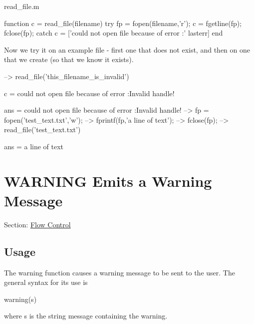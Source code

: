 \begin{DoxyVerb}     read_file.m
\end{DoxyVerb}



\begin{DoxyVerbInclude}
function c = read_file(filename)
try
   fp = fopen(filename,'r');
   c = fgetline(fp);
   fclose(fp);
catch
   c = ['could not open file because of error :' lasterr]
end
\end{DoxyVerbInclude}


Now we try it on an example file -\/ first one that does not exist, and then on one that we create (so that we know it exists).


\begin{DoxyVerbInclude}
--> read_file('this_filename_is_invalid')

c = 
could not open file because of error :Invalid handle!

ans = 
could not open file because of error :Invalid handle!
--> fp = fopen('test_text.txt','w');
--> fprintf(fp,'a line of text\n');
--> fclose(fp);
--> read_file('test_text.txt')

ans = 
a line of text
\end{DoxyVerbInclude}
 \hypertarget{flow_warning}{}\section{W\-A\-R\-N\-I\-N\-G Emits a Warning Message}\label{flow_warning}
Section\-: \hyperlink{sec_flow}{Flow Control} \hypertarget{vtkwidgets_vtkxyplotwidget_Usage}{}\subsection{Usage}\label{vtkwidgets_vtkxyplotwidget_Usage}
The {\ttfamily warning} function causes a warning message to be sent to the user. The general syntax for its use is \begin{DoxyVerb}   warning(s)
\end{DoxyVerb}
 where {\ttfamily s} is the string message containing the warning.

